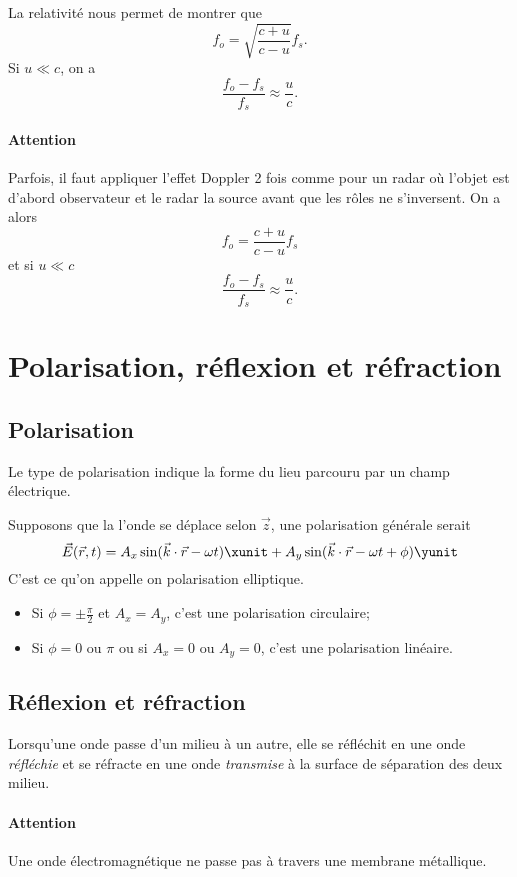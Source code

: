 La relativité nous permet de montrer que
\[ f_o = \sqrt{\frac{c + u}{c - u}}f_s. \]
Si $u \ll c$, on a
\[ \frac{f_o - f_s}{f_s} \approx \frac{u}{c}. \]

\paragraph{Attention} Parfois, il faut appliquer l'effet Doppler 2 fois
comme pour un radar où l'objet est d'abord observateur et le radar la source
avant que les rôles ne s'inversent.
On a alors
\[ f_o = \frac{c + u}{c - u}f_s \]
et si $u \ll c$
\[ \frac{f_o - f_s}{f_s} \approx \frac{u}{c}. \]

\section{Polarisation, réflexion et réfraction}
\subsection{Polarisation}
Le type de polarisation indique la forme du lieu parcouru
par un champ électrique.

Supposons que la l'onde se déplace selon $\vec{z}$,
une polarisation générale serait
\[ \vec{E}(\vec{r}, t) = A_x \sin(\vec{k}\cdot\vec{r} - \omega t) \xunit
+ A_y \sin(\vec{k} \cdot \vec{r} - \omega t + \phi) \yunit \]
C'est ce qu'on appelle on polarisation elliptique.

\begin{itemize}
  \item Si $\phi = \pm \frac{\pi}{2}$
    et $A_x = A_y$, c'est une polarisation circulaire;
  \item Si $\phi = 0$ ou $\pi$ ou si $A_x = 0$ ou $A_y = 0$,
    c'est une polarisation linéaire.
\end{itemize}

\subsection{Réflexion et réfraction}
Lorsqu'une onde passe d'un milieu à un autre,
elle se réfléchit en une onde \emph{réfléchie} et se réfracte en une onde
\emph{transmise} à la surface de séparation des deux milieu.

\paragraph{Attention}
Une onde électromagnétique ne passe pas à travers une membrane métallique.

